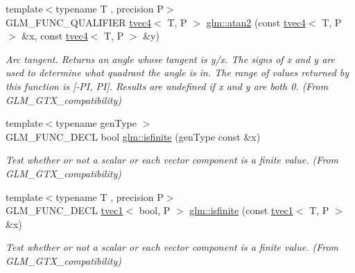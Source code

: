 \begin{DoxyCompactItemize}
\mbox{\label{group__gtx__compatibility_ga09d39c391a509a045b6c7061f15bdff5}} 
{\footnotesize template$<$typename T , precision P$>$ }\\G\+L\+M\+\_\+\+F\+U\+N\+C\+\_\+\+Q\+U\+A\+L\+I\+F\+I\+ER \hyperlink{structglm_1_1tvec4}{tvec4}$<$ T, P $>$ \hyperlink{group__gtx__compatibility_ga09d39c391a509a045b6c7061f15bdff5}{glm\+::atan2} (const \hyperlink{structglm_1_1tvec4}{tvec4}$<$ T, P $>$ \&x, const \hyperlink{structglm_1_1tvec4}{tvec4}$<$ T, P $>$ \&y)
\begin{DoxyCompactList}\small\item\em Arc tangent. Returns an angle whose tangent is y/x. The signs of x and y are used to determine what quadrant the angle is in. The range of values returned by this function is \mbox{[}-\/\+PI, PI\mbox{]}. Results are undefined if x and y are both 0. (From G\+L\+M\+\_\+\+G\+T\+X\+\_\+compatibility) \end{DoxyCompactList}\item 
\mbox{\label{group__gtx__compatibility_gaf4b04dcd3526996d68c1bfe17bfc8657}} 
{\footnotesize template$<$typename gen\+Type $>$ }\\G\+L\+M\+\_\+\+F\+U\+N\+C\+\_\+\+D\+E\+CL bool \hyperlink{group__gtx__compatibility_gaf4b04dcd3526996d68c1bfe17bfc8657}{glm\+::isfinite} (gen\+Type const \&x)
\begin{DoxyCompactList}\small\item\em Test whether or not a scalar or each vector component is a finite value. (From G\+L\+M\+\_\+\+G\+T\+X\+\_\+compatibility) \end{DoxyCompactList}\item 
\mbox{\label{group__gtx__compatibility_ga553e2e95b06a0f70c718605998889d3b}} 
{\footnotesize template$<$typename T , precision P$>$ }\\G\+L\+M\+\_\+\+F\+U\+N\+C\+\_\+\+D\+E\+CL \hyperlink{structglm_1_1tvec1}{tvec1}$<$ bool, P $>$ \hyperlink{group__gtx__compatibility_ga553e2e95b06a0f70c718605998889d3b}{glm\+::isfinite} (const \hyperlink{structglm_1_1tvec1}{tvec1}$<$ T, P $>$ \&x)
\begin{DoxyCompactList}\small\item\em Test whether or not a scalar or each vector component is a finite value. (From G\+L\+M\+\_\+\+G\+T\+X\+\_\+compatibility) \end{DoxyCompactList}\item 

\end{DoxyCompactItemize}
